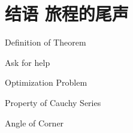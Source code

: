 \chapter*{ 结语 旅程的尾声}
 \begin{introduction}
  \item Definition of Theorem
  \item Ask for help
  \item Optimization Problem
  \item Property of Cauchy Series
  \item Angle of Corner
\end{introduction}


